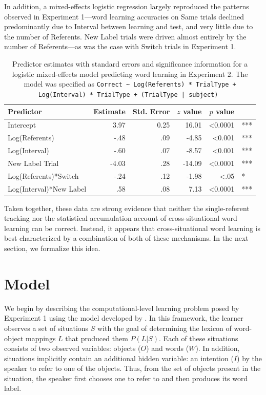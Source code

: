 \documentclass[man,floatsintext]{apa6}
\begin{document}
In addition, a mixed-effects logistic regression largely reproduced the patterns observed in Experiment 1---word learning accuracies on Same trials declined predominantly due to Interval between learning and test, and very little due to the number of Referents. New Label trials were driven almost entirely by the number of Referents---as was the case with Switch trials in Experiment 1.

\begin{table}
\begin{center}
\begin{tabular}{lrrrrl}
\hline
Predictor & Estimate & Std. Error & $z$ value & $p$ value & \\
\hline
Intercept & 3.97 & 0.25  & 16.01 &  <0.0001 & ***  \\
Log(Referents)  & -.48 & .09  & -4.85 &  <0.001 & ***   \\
Log(Interval)  & -.60 & .07  & -8.57 &  <0.001 & ***  \\
New Label Trial  & -4.03 & .28  & -14.09 &  <0.0001 & ***   \\
Log(Referents)*Switch  & -.24 & .12  & -1.98 &  <.05 & * \\
Log(Interval)*New Label  & .58 & .08 & 7.13 &  <0.0001 & ***   \\
\hline
\end{tabular}
\end{center}
\caption{\label{tab:exp2_reg}Predictor estimates with standard errors and significance information for a logistic mixed-effects model predicting word learning in Experiment 2. The model was specified as \small{\tt{Correct \textasciitilde \hspace{1pt} Log(Referents) * TrialType + Log(Interval) * TrialType + (TrialType | subject)} }}
\end{table}

Taken together, these data are strong evidence that neither the single-referent tracking nor the statistical accumulation account of cross-situational word learning can be correct. Instead, it appears that cross-situational word learning is best characterized by a combination of both of these mechanisms. In the next section, we formalize this idea.

\section{Model}

We begin by describing the computational-level learning problem posed by Experiment 1 using the model developed by . In this framework, the learner observes a set of situations $S$ with the goal of determining the lexicon of word-object mappings $L$ that produced them $P(L|S)$. Each of these situations consists of two observed variables: objects ($O$) and words ($W$). In addition, situations implicitly contain an additional hidden variable: an intention ($I$) by the speaker to refer to one of the objects. Thus, from the set of objects present in the situation, the speaker first chooses one to refer to and then produces its word label. 
\end{document}
